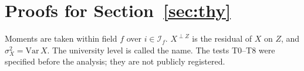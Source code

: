 \makeatletter
{}
\makeatother
\renewcommand{\thethylemma}{A\arabic{thylemma}}
\renewcommand{\thethyremark}{A\arabic{thyremark}}
\renewcommand{\thethycor}{A\arabic{thycor}}
\renewcommand{\thethyaprop}{A\arabic{thyaprop}}
\providecommand{\ci}[2]{$[#1,\allowbreak\,#2]$}
\providecommand{\thyqed}{\hfill$\square$}

\section{Proofs for Section~\ref{sec:thy}}\label{app:thy}

Moments are taken within field $f$ over $i\in\mathcal I_f$. $X^{\perp Z}$ is the residual of $X$ on $Z$, and
$\sigma_X^2=\mathrm{Var}\,X$. The university level is called the name. The tests T0--T8 were specified before the analysis; they are not publicly registered.


